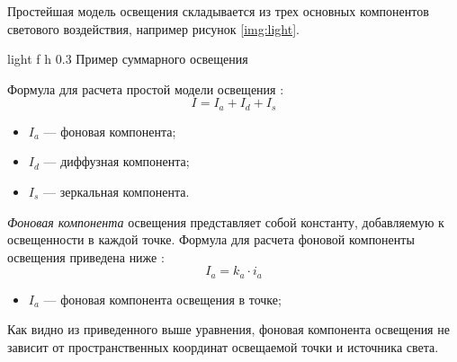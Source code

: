 Простейшая модель освещения складывается из трех основных компонентов светового воздействия, например рисунок \ref{img:light}.

{light} %
{f} %
{h} %
{0.3\textwidth} %
{Пример суммарного освещения} %



Формула для расчета простой модели освещения \cite{lightmodf}:
\begin{equation}
	I = I_{a} + I_{d} + I_{s}
\end{equation}

\begin{itemize}
	\item $I_{a}$ --- фоновая компонента;
	\item $I_{d}$ --- диффузная компонента;
	\item $I_{s}$ --- зеркальная компонента.
\end{itemize}

\textit{Фоновая компонента} освещения представляет собой константу, добавляемую к освещенности в каждой точке. Формула для расчета фоновой компоненты освещения приведена ниже \cite{lightmodf} : \begin{equation}
	I_{a}=k_{a} \cdot i_{a}
\end{equation}
\begin{itemize}
	\item $I_{a}$ --- фоновая компонента освещения в точке;
\end{itemize}

Как видно из приведенного выше уравнения, фоновая компонента освещения не зависит от пространственных координат освещаемой точки и источника света.

%
%
%
%

